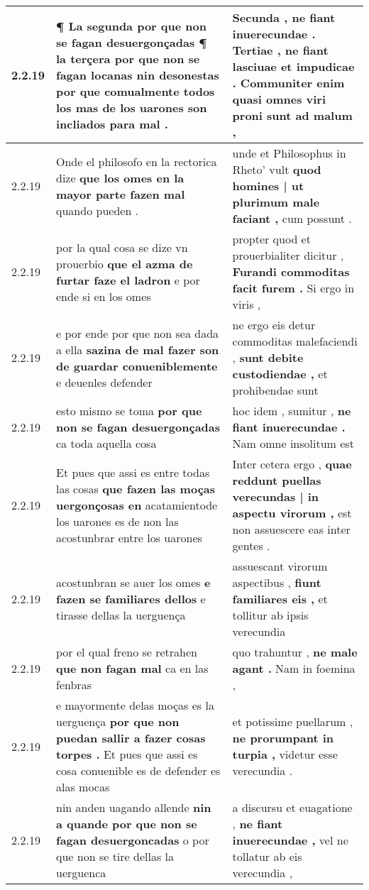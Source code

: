 \begin{tabular}{|p{1cm}|p{6.5cm}|p{6.5cm}|}
2.2.19 & ¶ La segunda por que non se fagan desuergonçadas ¶ la terçera \textbf{ por que non se fagan locanas nin desonestas } por que comualmente todos los mas de los uarones son incliados para mal . & Secunda , ne fiant inuerecundae . \textbf{ Tertiae , ne fiant lasciuae et impudicae . } Communiter enim quasi omnes viri proni sunt ad malum , \\\hline
2.2.19 & Onde el philosofo en la rectorica dize \textbf{ que los omes en la mayor parte fazen mal } quando pueden . & unde et Philosophus in Rheto’ vult \textbf{ quod homines | ut plurimum male faciant , } cum possunt . \\\hline
2.2.19 & por la qual cosa se dize vn prouerbio \textbf{ que el azma de furtar faze el ladron } e por ende si en los omes & propter quod et prouerbialiter dicitur , \textbf{ Furandi commoditas facit furem . } Si ergo in viris , \\\hline
2.2.19 & e por ende por que non sea dada a ella \textbf{ sazina de mal fazer son de guardar conueniblemente } e deuenles defender & ne ergo eis detur commoditas malefaciendi , \textbf{ sunt debite custodiendae , } et prohibendae sunt \\\hline
2.2.19 & esto mismo se toma \textbf{ por que non se fagan desuergonçadas } ca toda aquella cosa & hoc idem , sumitur , \textbf{ ne fiant inuerecundae . } Nam omne insolitum est \\\hline
2.2.19 & Et pues que assi es entre todas las cosas \textbf{ que fazen las moças uergonçosas en } acatamientode los uarones es de non las acostunbrar entre los uarones & Inter cetera ergo , \textbf{ quae reddunt puellas verecundas | in aspectu virorum , } est non assuescere eas inter gentes . \\\hline
2.2.19 & acostunbran se auer los omes \textbf{ e fazen se familiares dellos } e tirasse dellas la uerguença & assuescant virorum aspectibus , \textbf{ fiunt familiares eis , } et tollitur ab ipsis verecundia \\\hline
2.2.19 & por el qual freno se retrahen \textbf{ que non fagan mal } ca en las fenbras & quo trahuntur , \textbf{ ne male agant . } Nam in foemina , \\\hline
2.2.19 & e mayormente delas moças es la uerguença \textbf{ por que non puedan sallir a fazer cosas torpes . } Et pues que assi es cosa conuenible es de defender es alas mocas & et potissime puellarum , \textbf{ ne prorumpant in turpia , } videtur esse verecundia . \\\hline
2.2.19 & nin anden uagando allende \textbf{ nin a quande por que non se fagan desuergoncadas } o por que non se tire dellas la uerguenca & a discursu et euagatione , \textbf{ ne fiant inuerecundae , } vel ne tollatur ab eis verecundia , \\\hline

\end{tabular}
